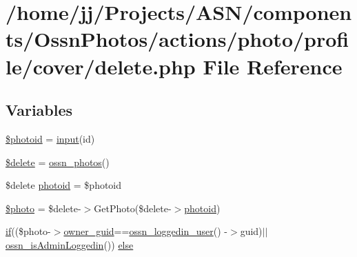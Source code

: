 \hypertarget{components_2_ossn_photos_2actions_2photo_2profile_2cover_2delete_8php}{}\section{/home/jj/\+Projects/\+A\+S\+N/components/\+Ossn\+Photos/actions/photo/profile/cover/delete.php File Reference}
\label{components_2_ossn_photos_2actions_2photo_2profile_2cover_2delete_8php}
\subsection*{Variables}
\begin{DoxyCompactItemize}
\item 
\hyperlink{components_2_ossn_photos_2actions_2photo_2profile_2cover_2delete_8php_a7407adedcade878fe9a46a9abd70298f}{\$photoid} = \hyperlink{ossn_8lib_8input_8php_a64ebee98b041c4f75f71ed3cd73cc8ed}{input}(\textquotesingle{}id\textquotesingle{})
\item 
\hyperlink{components_2_ossn_photos_2actions_2photo_2profile_2cover_2delete_8php_aba2374a8b713514611e21494ec2fef8d}{\$delete} = \hyperlink{ossn_8lib_8photos_8php_a66e905f107ea10ae8c2aa549b9234c5a}{ossn\+\_\+photos}()
\item 
\$delete \hyperlink{components_2_ossn_photos_2actions_2photo_2profile_2cover_2delete_8php_abb6af812fbce2cbbad5fc22cdbb4d396}{photoid} = \$photoid
\item 
\hyperlink{components_2_ossn_photos_2actions_2photo_2profile_2cover_2delete_8php_ae68c67c422f1090027f6eb6ba01b62b2}{\$photo} = \$delete-\/$>$Get\+Photo(\$delete-\/$>$\hyperlink{components_2_ossn_photos_2actions_2photo_2profile_2delete_8php_abb6af812fbce2cbbad5fc22cdbb4d396}{photoid})
\item 
\hyperlink{jquery_8tokeninput_8js_ad8dd46a3cbc004569e34401e9e71771a}{if}((\$photo-\/$>$\hyperlink{user_8php_a307051fefc937afd02c509c55646f50b}{owner\+\_\+guid}==\hyperlink{ossn_8lib_8users_8php_aa3c8068d0e6638b414d6a2f6c62565b8}{ossn\+\_\+loggedin\+\_\+user}() -\/$>$guid)$\vert$$\vert$\hyperlink{ossn_8lib_8users_8php_abf45a4c659ffd196160e8173c2af1106}{ossn\+\_\+is\+Admin\+Loggedin}()) \hyperlink{components_2_ossn_photos_2actions_2photo_2profile_2cover_2delete_8php_a184756f75a17a1d7c2189795e74832b3}{else}
\end{DoxyCompactItemize}


